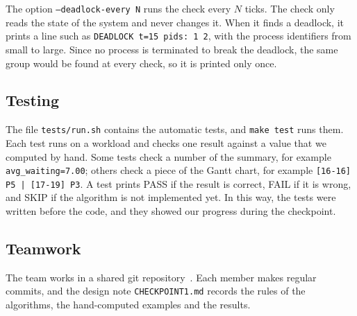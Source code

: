 The option \texttt{--deadlock-every N} runs the check every $N$ ticks. The check only reads the state of the system and never changes it. When it finds a deadlock, it prints a line such as \texttt{DEADLOCK t=15 pids: 1 2}, with the process identifiers from small to large. Since no process is terminated to break the deadlock, the same group would be found at every check, so it is printed only once.

\subsection{Testing}
The file \texttt{tests/run.sh} contains the automatic tests, and \texttt{make test} runs them. Each test runs \ossim{} on a workload and checks one result against a value that we computed by hand. Some tests check a number of the summary, for example \texttt{avg\_waiting=7.00}; others check a piece of the Gantt chart, for example \texttt{[16-16] P5 | [17-19] P3}. A test prints PASS if the result is correct, FAIL if it is wrong, and SKIP if the algorithm is not implemented yet. In this way, the tests were written before the code, and they showed our progress during the checkpoint.

\subsection{Teamwork}
The team works in a shared git repository~\cite{repo}. Each member makes regular commits, and the design note \texttt{CHECKPOINT1.md} records the rules of the algorithms, the hand-computed examples and the results.
